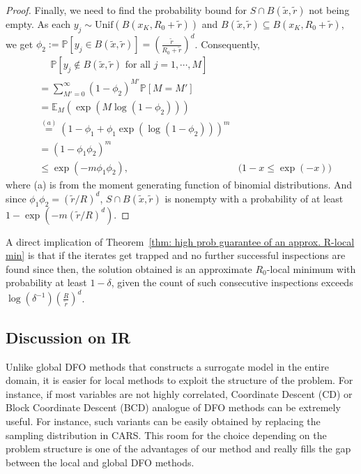 \begin{proof}
    Finally, we need to find the probability bound for $S \cap B(\tilde{x}, \tilde{r})$ not being empty. As each $y_j \sim \mathrm{Unif}(B(x_K, R_0 + \tilde{r}))$ and $B(\tilde{x},\tilde{r}) \subseteq B(x_K, R_0 + \tilde{r})$, we get $\phi_2 := \mathbb{P}[y_j \in B(\tilde{x}, \tilde{r})] = \left(\frac{\tilde{r}}{R_0 + \tilde{r}}\right)^d$. Consequently,
    \begin{align*}
        & \quad~\mathbb{P}[y_j \not\in B(\tilde{x}, \tilde{r}) \text{ for all } j = 1, \cdots, M] \\
        & =\sum_{M' = 0}^{\infty} \left(1 - \phi_2\right)^{M'} \mathbb{P}[M = M'] \\
        & =\mathbb{E}_{M}(\exp{(M\log(1-\phi_2))}) \\
        & \stackrel{(a)}{=} (1-\phi_1 + \phi_1 \exp{(\log(1-\phi_2))})^m \\
        & = (1-\phi_1 \phi_2 )^m \\
        & \leq \exp(-m\phi_1 \phi_2), & \text{($1-x \leq \exp(-x)$)}
    \end{align*}
    where (a) is from the moment generating function of binomial distributions.
    And since $\phi_1 \phi_2 = (\tilde{r}/R)^d$, $S \cap B(\tilde{x}, \tilde{r})$ is nonempty with a probability of at least $1 - \exp(-m (\tilde{r}/R)^d)$.
\end{proof}

A direct implication of Theorem~\ref{thm: high prob guarantee of an approx. R-local min} is that if the iterates get trapped and no further successful inspections are found since then, the solution obtained is an approximate $R_0$-local minimum with probability at least $1-\delta$, given the count of such consecutive inspections exceeds  $\log(\delta^{-1}) \left(\frac{R}{\tilde{r}}\right)^d$.

\subsection{Discussion on IR}
Unlike global DFO methods that constructs a surrogate model in the entire domain, it is easier for local methods to exploit the structure of the problem.
For instance, if most variables are not highly correlated, Coordinate Descent (CD) \cite{wright2015coordinate} or Block Coordinate Descent (BCD) \cite{tseng2001convergence} analogue of DFO methods can be extremely useful. For instance, such variants can be easily obtained by replacing the sampling distribution in CARS.
This room for the choice depending on the problem structure is one of the advantages of our method and really fills the gap between the local and global DFO methods.